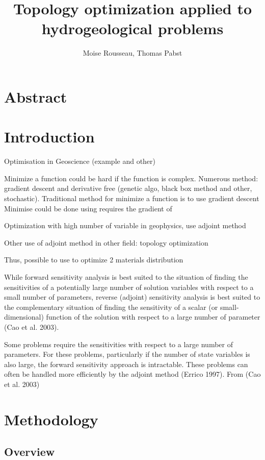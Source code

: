 \documentclass[11pt]{article}
\title{\textbf{Topology optimization applied to hydrogeological problems}}
\author{Moise Rousseau, Thomas Pabst}
\date{}
\begin{document}
\maketitle
\thispagestyle{empty}

\section*{Abstract}



\section{Introduction}

Optimisation in Geoscience (example and other)

Minimize a function could be hard if the function is complex. Numerous method: gradient descent and derivative free (genetic algo, black box method and other, stochastic).
Traditional method for minimize a function is to use gradient descent
Minimise could be done using requires the gradient of 

Optimization with high number of variable in geophysics, use adjoint method

Other use of adjoint method in other field: topology optimization 

Thus, possible to use to optimize 2 materials distribution

While forward sensitivity analysis is best suited to the situation of finding the sensitivities of a potentially large number of solution variables with respect to a small number of parameters, reverse (adjoint) sensitivity analysis is best suited to the complementary situation of finding the sensitivity of a scalar (or small-dimensional) function of the solution with respect to a large number of parameter (Cao et al. 2003).

Some problems require the sensitivities with respect to a large number of parameters. For these problems, particularly if the number of state variables is also large, the forward sensitivity approach is intractable. These problems can often be handled more efficiently by the adjoint method (Errico 1997). From (Cao et al. 2003)




\section{Methodology}

\subsection{Overview}
\end{document}

